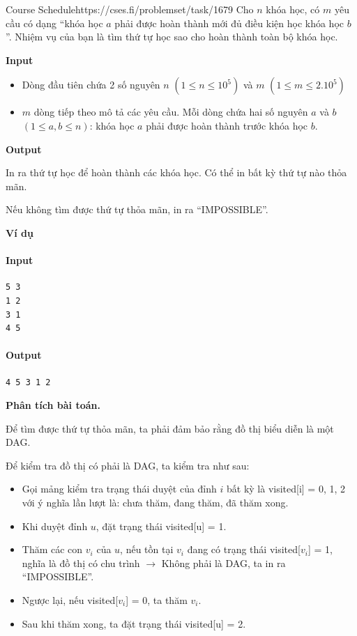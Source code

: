 \begin{baitap}{Course Schedule}{https://cses.fi/problemset/task/1679}
\noindent
Cho $n$ khóa học, có $m$ yêu cầu có dạng ``khóa học $a$ phải được hoàn thành mới đủ điều kiện học khóa học $b$''. Nhiệm vụ của bạn là tìm thứ tự học sao cho hoàn thành toàn bộ khóa học.

\textbf{Input}

\begin{itemize}
    \item Dòng đầu tiên chứa 2 số nguyên $n$ $(1 \leq n \leq 10^5)$ và $m$ $(1 \leq m \leq 2.10^5)$
    \item $m$ dòng tiếp theo mô tả các yêu cầu. Mỗi dòng chứa hai số nguyên $a$ và $b$ $(1 \leq a, b \leq n)$: khóa học $a$ phải được hoàn thành trước khóa học $b$.
\end{itemize}

\textbf{Output}

In ra thứ tự học để hoàn thành các khóa học. Có thể in bất kỳ thứ tự nào thỏa mãn. 

Nếu không tìm được thứ tự thỏa mãn, in ra ``IMPOSSIBLE''.

\textbf{Ví dụ}

\paragraph{Input}
\begin{lstlisting}
5 3
1 2
3 1
4 5
\end{lstlisting}

\paragraph{Output}
\begin{lstlisting}
4 5 3 1 2
\end{lstlisting}

\end{baitap}



\textbf{Phân tích bài toán.}

Để tìm được thứ tự thỏa mãn, ta phải đảm bảo rằng đồ thị biểu diễn là một DAG. 

Để kiểm tra đồ thị có phải là DAG, ta kiểm tra như sau:
\begin{itemize}
    \item Gọi mảng kiểm tra trạng thái duyệt của đỉnh $i$ bất kỳ là visited[i] = {0, 1, 2} với ý nghĩa lần lượt là: chưa thăm, đang thăm, đã thăm xong.
    \item Khi duyệt đỉnh $u$, đặt trạng thái visited[u] = 1.
    \item Thăm các con $v_i$ của $u$, nếu tồn tại $v_i$ đang có trạng thái visited[$v_i$] = 1, nghĩa là đồ thị có chu trình $\rightarrow$ Không phải là DAG, ta in ra ``IMPOSSIBLE''.
    \item Ngược lại, nếu visited[$v_i$] = 0, ta thăm $v_i$.
    \item Sau khi thăm xong, ta đặt trạng thái visited[u] = 2. 
\end{itemize}

